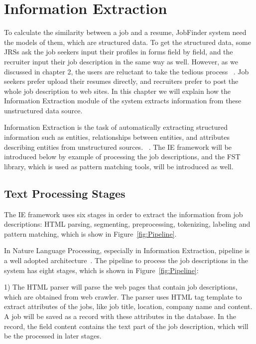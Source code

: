 \chapter{Information Extraction}

To calculate the similarity between a job and a resume, JobFinder system need the models of them, which are  structured data. To get the structured data, some JRSs ask the job seekers input their profiles in forms field by field, and the recruiter input their job description in the same way as well. However, as we discussed in chapter 2, the users are reluctant to take the tedious process ~\cite{singh2010prospect}. Job seekers prefer upload their resumes directly, and recruiters prefer to post the whole job description to web sites. In this chapter we will explain how the Information Extraction module of the system extracts information from these unstructured data source.

Information Extraction is the task of automatically extracting structured information such as entities, relationships between entities, and attributes describing entities from unstructured sources. ~\cite{sarawagi2008information}.  The IE framework will be introduced below by example of processing the job descriptions, and the FST library, which is used as pattern matching tools, will be introduced as well.

\section{Text Processing Stages}

The IE framework uses six stages in order to extract the information from job descriptions: HTML parsing, segmenting, preprocessing, tokenizing, labeling and pattern matching, which is show in Figure~\ref{fig:Pipeline}.

In Nature Language Processing, especially in Information Extraction, pipeline is a well adopted architecture~\cite{sarawagi2008information}. The pipeline to process the job descriptions in the system has eight stages, which is shown in Figure~\ref{fig:Pipeline}:

1) The HTML parser will parse the web pages that contain job descriptions, which are obtained from web crawler. The parser uses HTML tag template to extract attributes of the jobs, like job title, location, company name and content. A job will be saved as a record with these attributes in the database. In the record, the field content contains the text part of the job description, which will be the processed in later stages.

